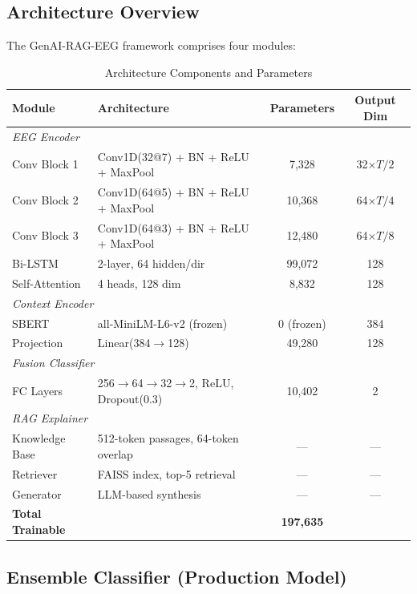 \documentclass[11pt,a4paper]{article}
\begin{document}
\subsection{Architecture Overview}

The GenAI-RAG-EEG framework comprises four modules:

\begin{table}[H]
\centering
\caption{Architecture Components and Parameters}
\small
\begin{tabular}{llcc}
\toprule
\textbf{Module} & \textbf{Architecture} & \textbf{Parameters} & \textbf{Output Dim} \\
\midrule
\multicolumn{4}{l}{\textit{EEG Encoder}} \\
\quad Conv Block 1 & Conv1D(32@7) + BN + ReLU + MaxPool & 7,328 & 32$\times T/2$ \\
\quad Conv Block 2 & Conv1D(64@5) + BN + ReLU + MaxPool & 10,368 & 64$\times T/4$ \\
\quad Conv Block 3 & Conv1D(64@3) + BN + ReLU + MaxPool & 12,480 & 64$\times T/8$ \\
\quad Bi-LSTM & 2-layer, 64 hidden/dir & 99,072 & 128 \\
\quad Self-Attention & 4 heads, 128 dim & 8,832 & 128 \\
\midrule
\multicolumn{4}{l}{\textit{Context Encoder}} \\
\quad SBERT & all-MiniLM-L6-v2 (frozen) & 0 (frozen) & 384 \\
\quad Projection & Linear(384$\to$128) & 49,280 & 128 \\
\midrule
\multicolumn{4}{l}{\textit{Fusion Classifier}} \\
\quad FC Layers & 256$\to$64$\to$32$\to$2, ReLU, Dropout(0.3) & 10,402 & 2 \\
\midrule
\multicolumn{4}{l}{\textit{RAG Explainer}} \\
\quad Knowledge Base & 512-token passages, 64-token overlap & --- & --- \\
\quad Retriever & FAISS index, top-5 retrieval & --- & --- \\
\quad Generator & LLM-based synthesis & --- & --- \\
\midrule
\textbf{Total Trainable} & & \textbf{197,635} & \\
\bottomrule
\end{tabular}
\end{table}

\subsection{Ensemble Classifier (Production Model)}
\end{document}
